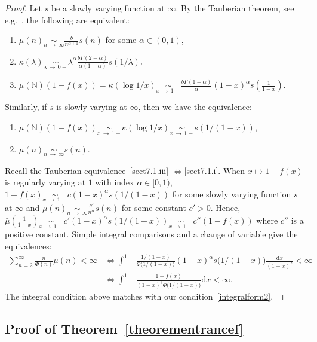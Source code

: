 \documentclass[AHL,Unicode,longabstracts,published]{cedram}
\newcommand{\ddr}{\mathrm{d}}
\newcommand{\bbN}{\mathbb{N}}
\newcommand*{\romanenumi}{\renewcommand*{\theenumi}{\roman{enumi}}}
\begin{document}
\begin{proof}
Let $s$ be a slowly varying function at $\infty$. By the Tauberian theorem, see e.g.~\cite[Chapter~0.7 page~10]{Bertoin96}, the following are equivalent:
\begin{enumerate}\romanenumi
\item\label{sect7.1.i} $\mu(n)\underset{n\,\rightarrow\,\infty}{\sim} \frac{b }{n^{\alpha+1}}s(n)$ for some $\alpha\in (0,1)$,
\item\label{sect7.1.ii} $\kappa(\lambda)\underset{\lambda\,\rightarrow\,0+}{\sim} \lambda^{\alpha}\frac{b\Gamma(2-\alpha)}{\alpha(1-\alpha)}s(1/\lambda)$,
\item\label{sect7.1.iii} $\mu(\bbN)(1-f(x))=\kappa(\log 1/x)\underset{x\,\rightarrow\,1-}{\sim} \frac{b\Gamma(1-\alpha)}{\alpha}(1-x)^{\alpha}s(\frac{1}{1-x}).$
\end{enumerate}
Similarly, if $s$ is slowly varying at $\infty$, then we have the equivalence:
\begin{enumerate}
\item $\mu(\bbN)(1-f(x))\underset{x\,\rightarrow\,1-}{\sim}\kappa(\log 1/x)\underset{x\,\rightarrow\,1-}{\sim} s(1/(1-x))$,
\item $\bar{\mu}(n)\underset{n\,\rightarrow\,\infty}{\sim} s(n)$.
\end{enumerate}
Recall the Tauberian equivalence~\eqref{sect7.1.iii} $\Longleftrightarrow$\eqref{sect7.1.i}. When $x\mapsto 1-f(x)$ is regularly varying at $1$ with index $\alpha\in [0,1)$, $1-f(x)\underset{x\,\rightarrow\,1-}{\sim} c(1-x)^{\alpha}s(1/(1-x))$ for some slowly varying function $s$ at $\infty$ and $\bar{\mu}(n)\underset{n\,\rightarrow\,\infty}{\sim} \frac{c'}{n^{\alpha}}s(n)$ for some constant $c'>0$. Hence, $\bar{\mu}(\frac{1}{1-x})\underset{x\,\rightarrow\,1-}{\sim} c'(1-x)^{\alpha}s(1/(1-x)) \underset{x\,\rightarrow\,1-}{\sim} c'' (1-f(x))$ where $c''$ is a positive constant. Simple integral comparisons and a change of variable give the equivalences:
\begin{align*}
\sum_{n=2}^{\infty}\frac{n}{\Phi(n)}\bar{\mu}(n)<\infty &\Longleftrightarrow \int^{1-}\frac{1/(1-x)}{\Phi\big(1/(1-x)\big)} (1-x)^{\alpha}s\big(1/(1-x)\big)\frac{\ddr x}{(1-x)^2}<\infty \\
&\Longleftrightarrow \int^{1-}\frac{1-f(x)}{(1-x)^3\Phi\big(1/(1-x)\big)} \ddr x<\infty.
\end{align*}
The integral condition above matches with our condition~\eqref{integralform2}.
\end{proof}


\subsection{Proof of Theorem~\ref{theorementrancef}}
\end{document}

